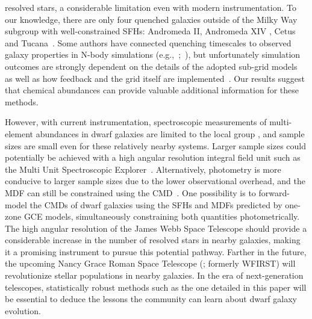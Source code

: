 resolved stars, a considerable limitation even with modern instrumentation.
To our knowledge, there are only four quenched galaxies outside of the Milky
Way subgroup with well-constrained SFHs: Andromeda II, Andromeda XIV
\citep{Weisz2014a}, Cetus~\citep{Monelli2010a} and Tucana~\citep{Monelli2010b}.
Some authors have connected quenching timescales to observed galaxy properties
in N-body simulations (e.g.,~\citealp*{Rocha2012};~\citealp{Slater2013,
Slater2014, Phillips2014, Phillips2015, Wheeler2014}), but unfortunately
simulation outcomes are strongly dependent on the details of the adopted
sub-grid models~\citep[e.g.,][]{Li2020} as well as how feedback and the grid
itself are implemented~\citep{Hu2022}.
Our results suggest that chemical abundances can provide valuable additional
information for these methods.
\par
However, with current instrumentation, spectroscopic measurements of
multi-element abundances in dwarf galaxies are limited to the local group
\citep[e.g.,][]{Kirby2011, Kirby2020}, and sample sizes are small even for
these relatively nearby systems.
Larger sample sizes could potentially be achieved with a high
angular resolution integral field unit such as the Multi Unit Spectroscopic
Explorer~\citep[MUSE;][]{Bacon2014}.
Alternatively, photometry is more conducive to larger sample sizes due to the
lower observational overhead, and the MDF can still be constrained using the
CMD~\citep[e.g.,][]{Lianou2011}.
One possibility is to forward-model the CMDs of dwarf galaxies using the SFHs
and MDFs predicted by one-zone GCE models, simultaneously constraining both
quantities photometrically.
The high angular resolution of the James Webb Space Telescope
\citep[JWST;][]{Gardner2006} should provide a considerable increase in the
number of resolved stars in nearby galaxies, making it a promising instrument
to pursue this potential pathway.
Farther in the future, the upcoming Nancy Grace Roman Space Telescope
(\citealp{Spergel2013, Spergel2015}; formerly WFIRST) will revolutionize
stellar populations in nearby galaxies.
In the era of next-generation telescopes, statistically robust methods such as
the one detailed in this paper will be essential to deduce the lessons the
community can learn about dwarf galaxy evolution.

